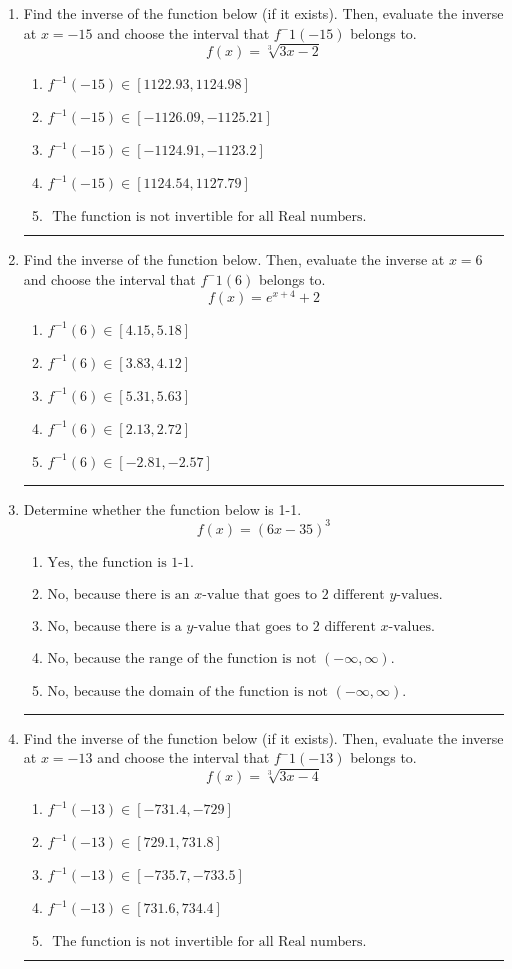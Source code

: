 \documentclass[14pt]{extbook}
\newcommand{\litem}[1]{\item#1\hspace*{-1cm}\rule{\textwidth}{0.4pt}}
\begin{document}
\begin{enumerate}
{\begin{enumerate}[label=\Alph*.]
\end{enumerate} }
\litem{
Find the inverse of the function below (if it exists). Then, evaluate the inverse at $x = -15$ and choose the interval that $f^-1(-15)$ belongs to.\[ f(x) = \sqrt[3]{3 x - 2} \]\begin{enumerate}[label=\Alph*.]
\item \( f^{-1}(-15) \in [1122.93, 1124.98] \)
\item \( f^{-1}(-15) \in [-1126.09, -1125.21] \)
\item \( f^{-1}(-15) \in [-1124.91, -1123.2] \)
\item \( f^{-1}(-15) \in [1124.54, 1127.79] \)
\item \( \text{ The function is not invertible for all Real numbers. } \)

\end{enumerate} }
\litem{
Find the inverse of the function below. Then, evaluate the inverse at $x = 6$ and choose the interval that $f^-1(6)$ belongs to.\[ f(x) = e^{x+4}+2 \]\begin{enumerate}[label=\Alph*.]
\item \( f^{-1}(6) \in [4.15, 5.18] \)
\item \( f^{-1}(6) \in [3.83, 4.12] \)
\item \( f^{-1}(6) \in [5.31, 5.63] \)
\item \( f^{-1}(6) \in [2.13, 2.72] \)
\item \( f^{-1}(6) \in [-2.81, -2.57] \)

\end{enumerate} }
\litem{
Determine whether the function below is 1-1.\[ f(x) = (6 x - 35)^3 \]\begin{enumerate}[label=\Alph*.]
\item \( \text{Yes, the function is 1-1.} \)
\item \( \text{No, because there is an $x$-value that goes to 2 different $y$-values.} \)
\item \( \text{No, because there is a $y$-value that goes to 2 different $x$-values.} \)
\item \( \text{No, because the range of the function is not $(-\infty, \infty)$.} \)
\item \( \text{No, because the domain of the function is not $(-\infty, \infty)$.} \)

\end{enumerate} }
\litem{
Find the inverse of the function below (if it exists). Then, evaluate the inverse at $x = -13$ and choose the interval that $f^-1(-13)$ belongs to.\[ f(x) = \sqrt[3]{3 x - 4} \]\begin{enumerate}[label=\Alph*.]
\item \( f^{-1}(-13) \in [-731.4, -729] \)
\item \( f^{-1}(-13) \in [729.1, 731.8] \)
\item \( f^{-1}(-13) \in [-735.7, -733.5] \)
\item \( f^{-1}(-13) \in [731.6, 734.4] \)
\item \( \text{ The function is not invertible for all Real numbers. } \)


\end{enumerate}}
\end{enumerate}
\end{document}

